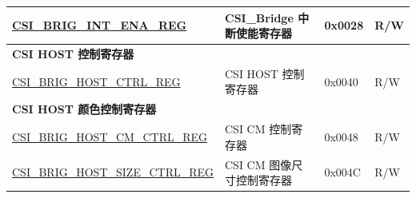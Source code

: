 \begin{longtable}{ | p{6cm} | p{7.2cm} | p{1.3cm} | p{1cm} | }
\hyperref[regdesc:CSIBRIGINTENAREG]{CSI\_BRIG\_INT\_ENA\_REG} & CSI\_Bridge 中断使能寄存器 & 0x0028 & R/W \\ \hline
\multicolumn{4}{|l|}{\textbf{CSI HOST 控制寄存器}} \\ \hline
\hyperref[regdesc:CSIBRIGHOSTCTRLREG]{CSI\_BRIG\_HOST\_CTRL\_REG} & CSI HOST 控制寄存器 & 0x0040 & R/W \\ \hline
\multicolumn{4}{|l|}{\textbf{CSI HOST 颜色控制寄存器}} \\ \hline
\hyperref[regdesc:CSIBRIGHOSTCMCTRLREG]{CSI\_BRIG\_HOST\_CM\_CTRL\_REG} & CSI CM 控制寄存器 & 0x0048 & R/W \\ \hline
\hyperref[regdesc:CSIBRIGHOSTSIZECTRLREG]{CSI\_BRIG\_HOST\_SIZE\_CTRL\_REG} & CSI CM 图像尺寸控制寄存器 & 0x004C & R/W \\ \hline
\end{longtable}
